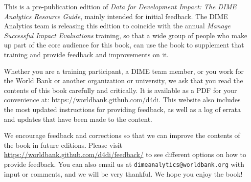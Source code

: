 This is a pre-publication edition of
\textit{Data for Development Impact:
The DIME Analytics Resource Guide}, mainly intended for initial feedback.
The DIME Analytics team is releasing this edition
to coincide with the annual \textit{Manage Successful Impact Evaluations} training,
so that a wide group of people who make up
part of the core audience for this book,
can use the book to supplement that training
and provide feedback and improvements on it.

Whether you are a training participant,
a DIME team member, or you work for the World Bank
or another organization or university,
we ask that you read the contents of this book carefully and critically.
It is available as a PDF for your convenience at:
\url{https://worldbank.github.com/d4di}.
This website also includes the most updated instructions
for providing feedback, as well as
a log of errata and updates that have been made to the content.

We encourage feedback and corrections
so that we can improve the contents of the book
in future editions. Please visit 
\url{https://worldbank.github.com/d4di/feedback/} to 
see different options on how to provide feedback.
You can also email us at \texttt{dimeanalytics@worldbank.org}
with input or comments, and we will be very thankful.
We hope you enjoy the book!

